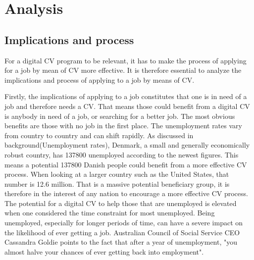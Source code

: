 \section{Analysis}\label{sec:analysis}

\subsection{Implications and process}
For a digital CV program to be relevant, it has to make the process of applying for a job by mean of CV more effective.  
It is therefore essential to analyze the implications and process of applying to a job by means of CV.

Firstly, the implications of applying to a job constitutes that one is in need of a job and therefore needs a CV.
That means those could benefit from a digital CV is anybody in need of a job, or searching for a better job. 
The most obvious benefits are those with no job in the first place. 
The unemployment rates vary from country to country and can shift rapidly.
As discussed in background(Unemployment rates), Denmark, a small and generally economically robust country, has 137800 unemployed according to the newest figures. 
This means a potential 137800 Danish people could benefit from a more effective CV process. 
When looking at a larger country such as the United States, that number is 12.6 million.
That is a massive potential beneficiary group, it is therefore in the interest of any nation to encourage a more effective CV process.
The potential for a digital CV to help those that are unemployed is elevated when one considered the time constraint for most unemployed.
Being unemployed, especially for longer periods of time, can have a severe impact on the likelihood of ever getting a job.
Australian Council of Social Service CEO Cassandra Goldie points to the fact that after a year of unemployment, "you almost halve your chances of ever getting back into employment".

